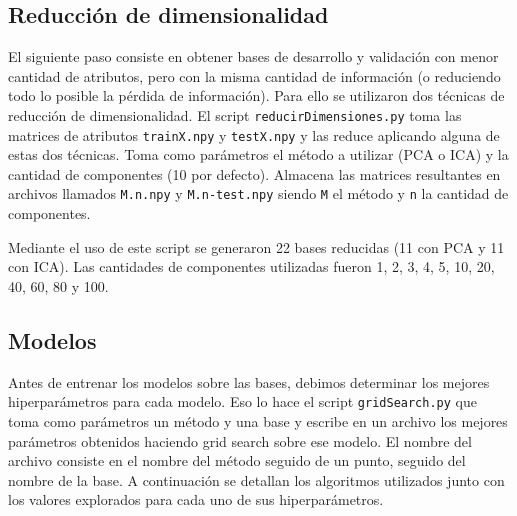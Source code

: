 \documentclass[10pt, a4paper]{article}
\begin{document}
\subsection{Reducción de dimensionalidad}

El siguiente paso consiste en obtener bases de desarrollo y validación con menor cantidad de atributos, pero con la misma cantidad de información (o reduciendo todo lo posible la pérdida de información). Para ello se utilizaron dos técnicas de reducción de dimensionalidad. El script \texttt{reducirDimensiones.py} toma las matrices de atributos \texttt{trainX.npy} y \texttt{testX.npy} y las reduce aplicando alguna de estas dos técnicas. Toma como parámetros el método a utilizar (PCA o ICA) y la cantidad de componentes (10 por defecto). Almacena las matrices resultantes en archivos llamados \texttt{M.n.npy} y \texttt{M.n-test.npy} siendo \texttt{M} el método y \texttt{n} la cantidad de componentes.

Mediante el uso de este script se generaron 22 bases reducidas (11 con PCA y 11 con ICA). Las cantidades de componentes utilizadas fueron 1, 2, 3, 4, 5, 10, 20, 40, 60, 80 y 100.

\subsection{Modelos}

Antes de entrenar los modelos sobre las bases, debimos determinar los mejores hiperparámetros para cada modelo. Eso lo hace el script \texttt{gridSearch.py} que toma como parámetros un método y una base y escribe en un archivo los mejores parámetros obtenidos haciendo grid search sobre ese modelo. El nombre del archivo consiste en el nombre del método seguido de un punto, seguido del nombre de la base.
A continuación se detallan los algoritmos utilizados junto con los valores explorados para cada uno de sus hiperparámetros.
\end{document}
